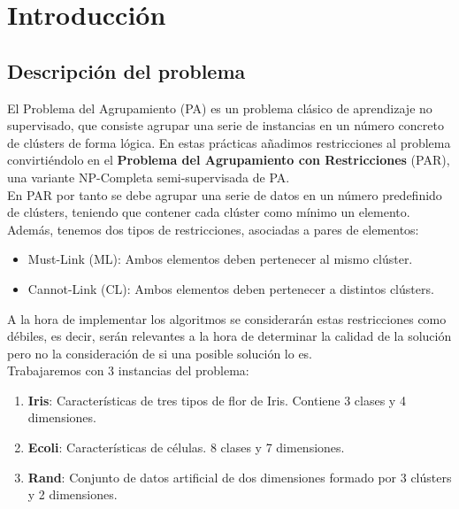 \section{Introducción}

\subsection{Descripción del problema}

El Problema del Agrupamiento (PA) es un problema clásico de aprendizaje no supervisado, que consiste agrupar una serie de instancias en un número concreto de clústers de forma lógica. En estas prácticas añadimos restricciones al problema convirtiéndolo en el \textbf{Problema del Agrupamiento con Restricciones} (PAR), una variante NP-Completa semi-supervisada de PA. \\

En PAR por tanto se debe agrupar una serie de datos en un número predefinido de clústers, teniendo que contener cada clúster como mínimo un elemento.
Además, tenemos dos tipos de restricciones, asociadas a pares de elementos:
\begin{itemize}
    \item Must-Link (ML): Ambos elementos deben pertenecer al mismo clúster.
    \item Cannot-Link (CL): Ambos elementos deben pertenecer a distintos clústers.
\end{itemize}

A la hora de implementar los algoritmos se considerarán estas restricciones como débiles, es decir, serán relevantes a la hora de determinar la calidad de la solución pero no la consideración de si una posible solución lo es. \\

Trabajaremos con 3 instancias del problema:
\begin{enumerate}
    \item \textbf{Iris}: Características de tres tipos de flor de Iris. Contiene 3 clases y 4 dimensiones.
    \item \textbf{Ecoli}: Características de células. 8 clases y 7 dimensiones.
    \item \textbf{Rand}: Conjunto de datos artificial de dos dimensiones formado por 3 clústers y 2 dimensiones.
\end{enumerate}

